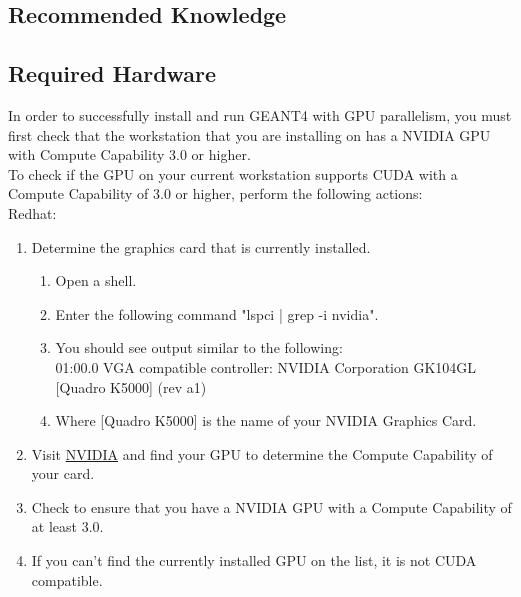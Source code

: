 \documentclass[12pt]{article}
\begin{document}
\subsection{Recommended Knowledge} %

\subsection{Required Hardware} %
In order to successfully install and run GEANT4 with GPU parallelism, you must first check that the workstation that you are installing on has a NVIDIA GPU with Compute Capability 3.0 or higher.\\
To check if the GPU on your current workstation supports CUDA with a Compute Capability of 3.0 or higher, perform the following actions:\\

Redhat:
\begin{enumerate}
\item Determine the graphics card that is currently installed.
\begin{enumerate}
\item Open a shell.
\item Enter the following command "lspci | grep -i nvidia".
\item You should see output similar to the following:\\
01:00.0 VGA compatible controller: NVIDIA Corporation GK104GL [Quadro K5000] (rev a1)
\item Where [Quadro K5000] is the name of your NVIDIA Graphics Card.
\end{enumerate}
\item Visit \href{https://developer.nvidia.com/cuda-gpus}{NVIDIA} and find your GPU to determine the Compute Capability of your card.
\item Check to ensure that you have a NVIDIA GPU with a  Compute Capability of at least 3.0.
\item If you can't find the currently installed GPU on the list, it is not CUDA compatible.
\end{enumerate}
\end{document}
